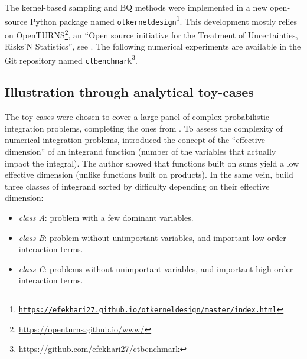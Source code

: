 The kernel-based sampling and BQ methods were implemented in a new open-source Python package named \texttt{otkerneldesign\footnote{\href{https://efekhari27.github.io/otkerneldesign/master/index.html}{https://efekhari27.github.io/otkerneldesign/master/index.html}}}. 
This development mostly relies on OpenTURNS\footnote{\href{https://openturns.github.io/www/}{https://openturns.github.io/www/}}, an ``Open source initiative for the Treatment of Uncertainties, Risks'N Statistics'', see \cite{baudin_dutfoy_2017}. 
The following numerical experiments are available in the Git repository named \texttt{ctbenchmark}\footnote{\href{https://github.com/efekhari27/ctbenchmark}{https://github.com/efekhari27/ctbenchmark}}. 


\subsection{Illustration through analytical toy-cases}
The toy-cases were chosen to cover a large panel of complex probabilistic integration problems, completing the ones from \cite{fekhari_renew_2021}.
To assess the complexity of numerical integration problems, \cite{owen_2003} introduced the concept of the ``effective dimension'' of an integrand function (number of the variables that actually impact the integral). 
The author showed that functions built on sums yield a low effective dimension (unlike functions built on products). 
In the same vein, \cite{kucherenko_feil_2011} build three classes of integrand sorted by difficulty depending on their effective dimension: \begin{itemize}
    \item \emph{class A}: problem with a few dominant variables.
    \item \emph{class B}: problem without unimportant variables, and important low-order interaction terms.
    \item \emph{class C}: problems without unimportant variables, and important high-order interaction terms. 
\end{itemize}
